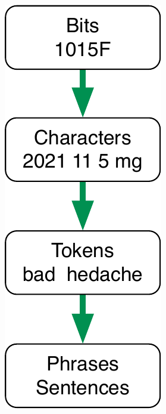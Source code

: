 \documentclass[landscape,footrule]{foils}
\begin{document}
\includegraphics[scale=1.0, trim= 0cm -0.25cm 0cm 0cm, clip]{abstraction-levels-in-text-mining}\hspace*{0.5cm}
\end{document}
